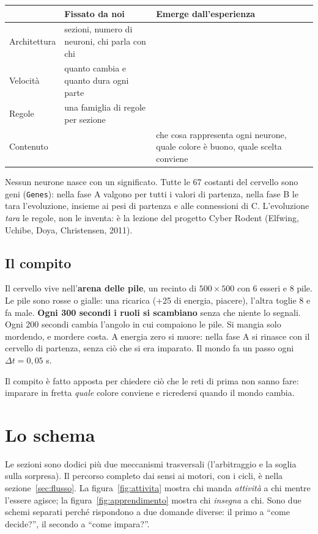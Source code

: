 \documentclass[11pt,a4paper]{article}
\begin{document}
\begin{center}
\begin{tabularx}{\textwidth}{lYY}
\toprule
& \textbf{Fissato da noi} & \textbf{Emerge dall'esperienza} \\
\midrule
Architettura & sezioni, numero di neuroni, chi parla con chi & \\
Velocità & quanto cambia e quanto dura ogni parte & \\
Regole & una famiglia di regole per sezione & \\
Contenuto & & che cosa rappresenta ogni neurone, quale colore è buono, quale scelta conviene \\
\bottomrule
\end{tabularx}
\end{center}

Nessun neurone nasce con un significato. Tutte le 67 costanti del cervello sono
geni (\texttt{Genes}): nella fase A valgono per tutti i valori di partenza, nella
fase B le tara l'evoluzione, insieme ai pesi di partenza e alle connessioni di C.
L'evoluzione \emph{tara} le regole, non le inventa: è la lezione del progetto Cyber
Rodent (Elfwing, Uchibe, Doya, Christensen, 2011).

\subsection{Il compito}

Il cervello vive nell'\textbf{arena delle pile}, un recinto di $500\times500$ con 6
esseri e 8 pile. Le pile sono rosse o gialle: una ricarica (+25 di energia, piacere),
l'altra toglie 8 e fa male. \textbf{Ogni 300 secondi i ruoli si scambiano} senza che
niente lo segnali. Ogni 200 secondi cambia l'angolo in cui compaiono le pile. Si
mangia solo mordendo, e mordere costa. A energia zero si muore: nella fase A si
rinasce con il cervello di partenza, senza ciò che si era imparato. Il mondo fa un
passo ogni $\Delta t = 0{,}05$ s.

Il compito è fatto apposta per chiedere ciò che le reti di prima non sanno fare:
imparare in fretta \emph{quale} colore conviene e ricredersi quando il mondo cambia.

\section{Lo schema}\label{sec:schema}

Le sezioni sono dodici più due meccanismi trasversali (l'arbitraggio e la soglia
sulla sorpresa). Il percorso completo dai sensi ai motori, con i cicli, è nella
sezione~\ref{sec:flusso}. La figura~\ref{fig:attivita} mostra chi manda \emph{attività} a chi
mentre l'essere agisce; la figura~\ref{fig:apprendimento} mostra chi \emph{insegna} a
chi. Sono due schemi separati perché rispondono a due domande diverse: il primo a
``come decide?'', il secondo a ``come impara?''.
\end{document}
